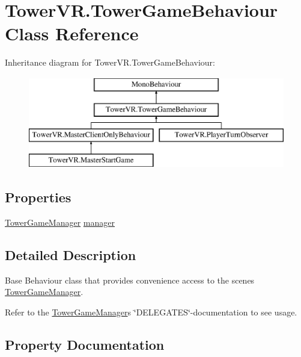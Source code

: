 \hypertarget{class_tower_v_r_1_1_tower_game_behaviour}{}\section{Tower\+V\+R.\+Tower\+Game\+Behaviour Class Reference}
\label{class_tower_v_r_1_1_tower_game_behaviour}
Inheritance diagram for Tower\+V\+R.\+Tower\+Game\+Behaviour\+:\begin{figure}[H]
\begin{center}
\leavevmode
\includegraphics[height=4.000000cm]{class_tower_v_r_1_1_tower_game_behaviour}
\end{center}
\end{figure}
\subsection*{Properties}
\begin{DoxyCompactItemize}
\item 
\hyperlink{class_tower_v_r_1_1_tower_game_manager}{Tower\+Game\+Manager} \hyperlink{class_tower_v_r_1_1_tower_game_behaviour_a5f0dc5fad7fbdcd09370d373329c00c7}{manager}
\end{DoxyCompactItemize}


\subsection{Detailed Description}
Base Behaviour class that provides convenience access to the scene\textquotesingle{}s \hyperlink{class_tower_v_r_1_1_tower_game_manager}{Tower\+Game\+Manager}.

Refer to the \hyperlink{class_tower_v_r_1_1_tower_game_manager}{Tower\+Game\+Manager}\textquotesingle{}s \char`\"{}\+D\+E\+L\+E\+G\+A\+T\+E\+S\char`\"{}-\/documentation to see usage. 

\subsection{Property Documentation}
